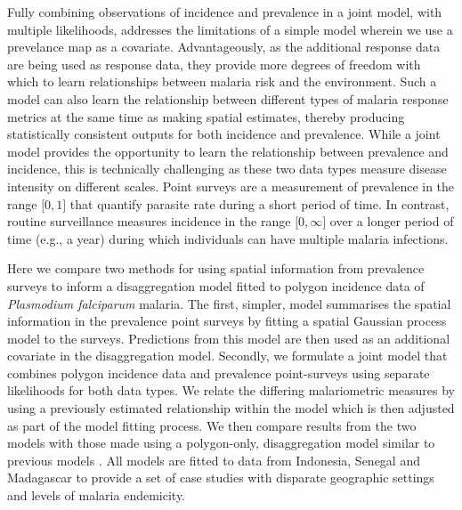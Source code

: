 \documentclass{statsoc}
\begin{document}
Fully combining observations of incidence and prevalence in a joint model, with multiple likelihoods, addresses the limitations of a simple model wherein we use a prevelance map as a covariate.
Advantageously, as the additional response data are being used as response data, they provide more degrees of freedom with which to learn relationships between malaria risk and the environment.
Such a model can also learn the relationship between different types of malaria response metrics at the same time as making spatial estimates, thereby producing statistically consistent outputs for both incidence and prevalence.
While a joint model provides the opportunity to learn the relationship between prevalence and incidence, this is technically challenging as these two data types measure disease intensity on different scales.
Point surveys are a measurement of prevalence in the range $\lbrack 0, 1\rbrack$ that quantify parasite rate during a short period of time.
In contrast, routine surveillance measures incidence in the range $\lbrack 0, \infty\rbrack$ over a longer period of time (e.g., a year) during which individuals can have multiple malaria infections.



Here we compare two methods for using spatial information from prevalence surveys to inform a disaggregation model fitted to polygon incidence data of \emph{Plasmodium falciparum}  malaria.
The first, simpler, model summarises the spatial information in the prevalence point surveys by fitting a spatial Gaussian process model to the surveys.
Predictions from this model are then used as an additional covariate in the disaggregation model.
Secondly, we formulate a joint model that combines polygon incidence data and prevalence point-surveys using separate likelihoods for both data types.
We relate the differing malariometric measures by using a previously estimated relationship within the model \citep{cameron2015defining} which is then adjusted as part of the model fitting process.
We then compare results from the two models with those made using a polygon-only, disaggregation model similar to previous models \citep{sturrock2014fine, wilson2017pointless}.
All models are fitted to data from Indonesia, Senegal and Madagascar to provide a set of case studies with disparate geographic settings and levels of malaria endemicity.
\end{document}
